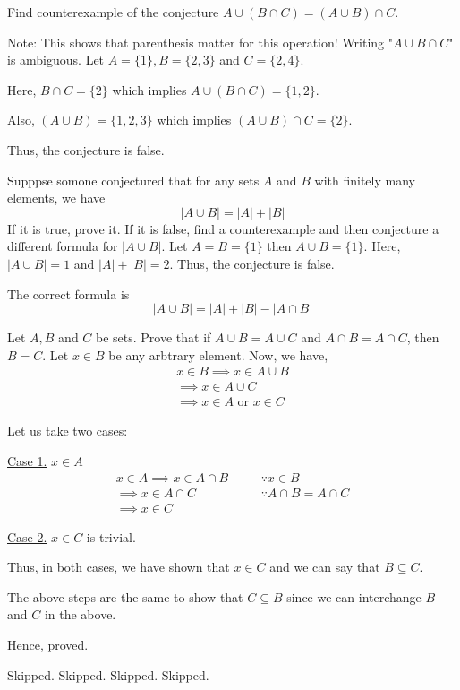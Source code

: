 \bp 
Find counterexample of the conjecture $A \cup (B \cap C) = (A \cup B) \cap C$.

Note: This shows that parenthesis matter for this operation! Writing "$A \cup B \cap C$" is ambiguous.
\ep
\bs
Let $A = \{1\}, B = \{2,3\}$ and $C = \{2,4\}$.

Here, $B \cap C = \{2\}$ which implies $A \cup (B \cap C) = \{1,2\}$.

Also, $(A \cup B) = \{1,2,3\}$ which implies $(A \cup B) \cap C = \{2\}$.

Thus, the conjecture is false.
\es


\bp
	Supppse somone conjectured that for any sets $A$ and $B$ with finitely many elements, we have $$|A \cup B| = |A| + |B|$$
	If it is true, prove it. If it is false, find a counterexample and then conjecture a different formula for $|A \cup B|$.
\ep
\bs
Let $A = B = \{1\}$ then $A \cup B = \{1\}$. 
Here, $|A \cup B| = 1$ and $|A| + |B| = 2$. 
Thus, the conjecture is false.

The correct formula is $$|A \cup B| = |A| + |B| - |A \cap B|$$
\es

\bp
Let $A, B$ and $C$ be sets. Prove that if $A \cup B = A \cup C$ and $A \cap B = A \cap C$, then $B = C$. 
\ep
\bs
	Let $x \in B$ be any arbtrary element. Now, we have,
	\begin{align*}
		x \in B \implies x \in A \cup B \\
		\implies x \in A \cup C \\
		\implies x \in A \text{ or } x \in C
	\end{align*}

	Let us take two cases:
	
	\underline{Case 1.} $x \in A$
	\begin{align*}
		x \in A \implies x \in A \cap B && \quad \because x \in B \\
		\implies x \in A \cap C && \quad \because A \cap B = A \cap C \\
		\implies x \in C
	\end{align*}

	\underline{Case 2.} $x \in C$ is trivial.
	\bigbreak

	Thus, in both cases, we have shown that $x \in C$ and we can say that $B \subseteq C$.

	The above steps are the same to show that $C \subseteq B$ since we can interchange $B$ and $C$ in the above.

	Hence, proved.
\es

\bp Skipped. \ep
\bp Skipped. \ep
\bp Skipped. \ep
\bp Skipped. \ep

